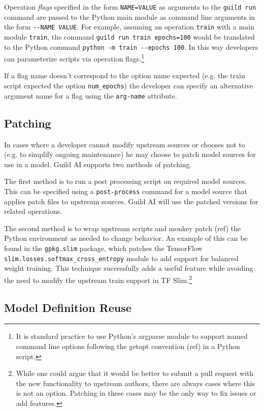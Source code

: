 \documentclass{article}
\begin{document}
Operation \emph{flags} specified in the form \verb|NAME=VALUE| as
arguments to the \verb|guild run| command are passed to the Python
main module as command line arguments in the form
\verb|--NAME VALUE|. For example, assuming an operation \verb|train|
with a main module \verb|train|, the command
\verb|guild run train epochs=100| would be translated to the Python
command \verb|python -m train --epochs 100|. In this way developers
can parameterize scripts via operation flags.\footnote{It is standard
  practice to use Python's argparse module to support named command
  line options following the getopt convention (ref) in a Python
  script.}

If a flag name doesn't correspond to the option name expected
(e.g. the train script expected the option \verb|num_epochs|) the
developer can specify an alternative argument name for a flag using
the \verb|arg-name| attribute.

\subsection{Patching}
\label{sec:patching}

In cases where a developer cannot modify upstream sources or chooses
not to (e.g. to simplify ongoing maintenance) he may choose to patch
model sources for use in a model. Guild AI supports two methods of
patching.

The first method is to run a post processing script on required model
sources. This can be specified using a \verb|post-process| command for
a model source that applies patch files to upstream sources. Guild AI
will use the patched versions for related operations.

The second method is to wrap upstream scripts and monkey patch (ref)
the Python environment as needed to change behavior. An example of
this can be found in the \verb|gpkg.slim| package, which patches the
TensorFlow \verb|slim.losses.softmax_cross_entropy| module to add
support for balanced weight training. This technique successfully adds
a useful feature while avoiding the need to modify the upstream train
support in TF Slim.\footnote{While one could argue that it would be
  better to submit a pull request with the new functionality to
  upstream authors, there are always cases where this is not an
  option. Patching in these cases may be the only way to fix issues or
  add features.}

\subsection{Model Definition Reuse}
\end{document}
